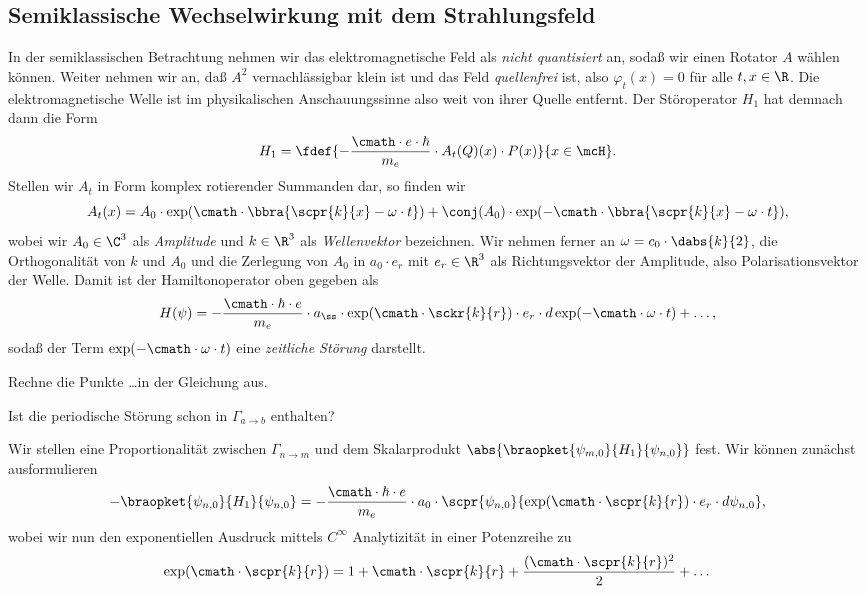 \documentclass{subfile}
\begin{document}
    
    \subsection{Semiklassische Wechselwirkung mit dem Strahlungsfeld}
        In der semiklassischen Betrachtung nehmen wir das elektromagnetische Feld als \emph{nicht quantisiert} an, sodaß wir einen Rotator $A$ wählen können. Weiter nehmen wir an, daß $A^2$ vernachlässigbar klein ist und das Feld \emph{quellenfrei} ist, also $\varphi_t(x) = 0$ für alle $t,x\in\R$. Die elektromagnetische Welle ist im physikalischen Anschauungssinne also weit von ihrer Quelle entfernt. Der Störoperator $H_1$ hat demnach dann die Form 
        \[
            H_1 = \fdef{-\frac{\cmath\cdot e\cdot\hbar}{m_e}\cdot A_t(Q)(x)\cdot P(x)}{x\in\mcH}.
        \]
        Stellen wir $A_t$ in Form komplex rotierender Summanden dar, so finden wir
        \[
            A_t(x) = A_0\cdot\exp(\cmath\cdot \bbra{\scpr{k}{x} - \omega\cdot t}) + \conj(A_0)\cdot\exp(-\cmath\cdot\bbra{\scpr{k}{x} - \omega\cdot t}),
        \]
        wobei wir $A_0\in\C^3$ als \emph{Amplitude} und $k\in\R^3$ als \emph{Wellenvektor} bezeichnen. Wir nehmen ferner an $\omega = c_0\cdot\dabs{k}{2}$, die Orthogonalität von $k$ und $A_0$ und die Zerlegung von $A_0$ in $a_0\cdot e_r$ mit $e_r\in\R^3$ als Richtungsvektor der Amplitude, also Polarisationsvektor der Welle. Damit ist der Hamiltonoperator oben gegeben als
        \[
            H(\psi) = -\frac{\cmath\cdot\hbar\cdot e}{m_e}\cdot a_ß\cdot\exp(\cmath\cdot\sckr{k}{r})\cdot e_r\cdot d\exp(-\cmath\cdot\omega\cdot t) + \dots,
        \] 
        sodaß der Term $\exp(-\cmath\cdot\omega\cdot t)$ eine \emph{zeitliche Störung} darstellt. 
        \begin{Aufgabe}
            \nr{} Rechne die Punkte \dots in der Gleichung aus. 

            \nr{} Ist die periodische Störung schon in $\Gamma_{a\to b}$ enthalten?
        \end{Aufgabe}
        \noindent Wir stellen eine Proportionalität zwischen $\Gamma_{n\to m}$ und dem Skalarprodukt $\abs{\braopket{\psi_{m,0}}{H_1}{\psi_{n,0}}}$ fest. Wir können zunächst ausformulieren 
        \[
            -\braopket{\psi_{n,0}}{H_1}{\psi_{n,0}} = -\frac{\cmath\cdot\hbar\cdot e}{m_e}\cdot a_0\cdot\scpr{\psi_{n,0}}{\exp(\cmath\cdot\scpr{k}{r})\cdot e_r\cdot d\psi_{n,0}},
        \]
        wobei wir nun den exponentiellen Ausdruck mittels $C^\infty$ Analytizität in einer Potenzreihe zu 
        \[
            \exp(\cmath\cdot\scpr{k}{r}) = 1 + \cmath\cdot\scpr{k}{r} + \frac{(\cmath\cdot\scpr{k}{r})^2}{2} + \dots
        \]
\end{document}
